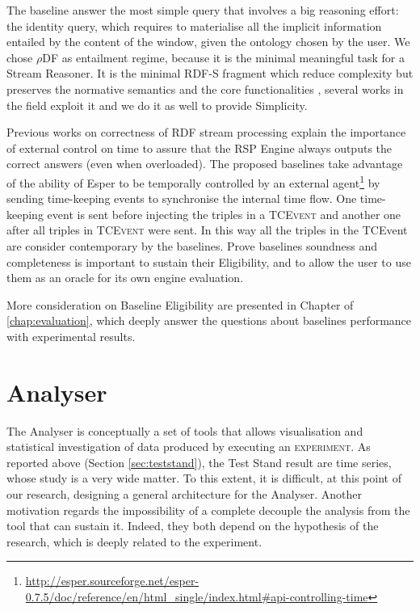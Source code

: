 The baseline answer the most simple query that involves a big reasoning effort: the identity query, which requires to materialise all the implicit information entailed by the content of the window, given the ontology chosen by the user. We chose  $\rho$DF as entailment regime, because it is the minimal meaningful task for a Stream Reasoner. It is the minimal RDF-S fragment which reduce complexity but preserves the normative semantics and the core functionalities \cite{DBLP:conf/esws/MunozPG07},  several works in the field exploit it  \cite{DBLP:conf/semweb/UrbaniMJHB13}  and we do it as well to provide Simplicity. 

Previous works on correctness of RDF stream processing \cite{DBLP:conf/semweb/DellAglioCBCV13} explain the importance of external control on time to assure that the RSP Engine always outputs the correct answers (even when overloaded). The proposed baselines take advantage of the ability of Esper to be temporally controlled by an external agent\footnote{\url{http://esper.sourceforge.net/esper-0.7.5/doc/reference/en/html_single/index.html#api-controlling-time}} by sending time-keeping events to synchronise the internal time flow. One time-keeping event is sent before injecting the triples in a \textsc{TCEvent} and another one after all triples in \textsc{TCEvent}  were sent. In this way all the triples in the TCEvent are consider contemporary by the baselines. Prove baselines soundness and completeness is important to sustain their Eligibility, and to allow the user to use them as an oracle for its own engine evaluation.

More consideration on Baseline Eligibility are presented in Chapter of \ref{chap:evaluation}, which deeply answer the questions about baselines performance with experimental results. 

\section{Analyser}\label{sec:analyser}

The Analyser is conceptually a set of tools that allows visualisation and statistical investigation of data produced by executing an \textsc{experiment}. As reported above (Section \ref{sec:teststand}), the Test Stand result are time series, whose study is a very wide matter. To this extent, it is difficult, at this point of our research, designing a general architecture for the Analyser. Another motivation regards the impossibility of a complete decouple the analysis from the tool that can sustain it. Indeed, they both depend on the hypothesis of the research, which is deeply related to the experiment. 

